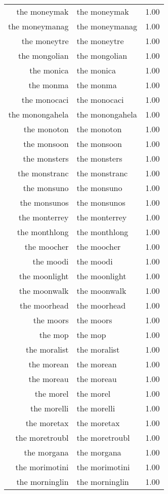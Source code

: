 \begin{table}[ht]
\begin{tabular}{rlr}
  the moneymak & the moneymak & 1.00 \\ 
  the moneymanag & the moneymanag & 1.00 \\ 
  the moneytre & the moneytre & 1.00 \\ 
  the mongolian & the mongolian & 1.00 \\ 
  the monica & the monica & 1.00 \\ 
  the monma & the monma & 1.00 \\ 
  the monocaci & the monocaci & 1.00 \\ 
  the monongahela & the monongahela & 1.00 \\ 
  the monoton & the monoton & 1.00 \\ 
  the monsoon & the monsoon & 1.00 \\ 
  the monsters & the monsters & 1.00 \\ 
  the monstranc & the monstranc & 1.00 \\ 
  the monsuno & the monsuno & 1.00 \\ 
  the monsunos & the monsunos & 1.00 \\ 
  the monterrey & the monterrey & 1.00 \\ 
  the monthlong & the monthlong & 1.00 \\ 
  the moocher & the moocher & 1.00 \\ 
  the moodi & the moodi & 1.00 \\ 
  the moonlight & the moonlight & 1.00 \\ 
  the moonwalk & the moonwalk & 1.00 \\ 
  the moorhead & the moorhead & 1.00 \\ 
  the moors & the moors & 1.00 \\ 
  the mop & the mop & 1.00 \\ 
  the moralist & the moralist & 1.00 \\ 
  the morean & the morean & 1.00 \\ 
  the moreau & the moreau & 1.00 \\ 
  the morel & the morel & 1.00 \\ 
  the morelli & the morelli & 1.00 \\ 
  the moretax & the moretax & 1.00 \\ 
  the moretroubl & the moretroubl & 1.00 \\ 
  the morgana & the morgana & 1.00 \\ 
  the morimotini & the morimotini & 1.00 \\ 
  the morninglin & the morninglin & 1.00 \\ 

\end{tabular}
\end{table}
